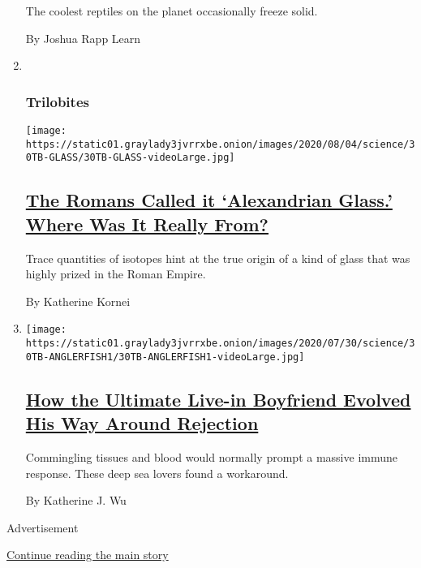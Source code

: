 \begin{enumerate}
  The coolest reptiles on the planet occasionally freeze solid.

  By Joshua Rapp Learn
\item ~
  \hypertarget{trilobites-2}{%
  \subsubsection{Trilobites}\label{trilobites-2}}

  \texttt{[image: https://static01.graylady3jvrrxbe.onion/images/2020/08/04/science/30TB-GLASS/30TB-GLASS-videoLarge.jpg]}

  \hypertarget{the-romans-called-it-alexandrian-glass-where-was-it-really-from}{%
  \subsection{\texorpdfstring{\href{/2020/07/31/science/alexandrian-glass-rome.html}{The
  Romans Called it `Alexandrian Glass.' Where Was It Really
  From?}}{The Romans Called it `Alexandrian Glass.' Where Was It Really From?}}\label{the-romans-called-it-alexandrian-glass-where-was-it-really-from}}

  Trace quantities of isotopes hint at the true origin of a kind of
  glass that was highly prized in the Roman Empire.

  By Katherine Kornei
\item
  \texttt{[image: https://static01.graylady3jvrrxbe.onion/images/2020/07/30/science/30TB-ANGLERFISH1/30TB-ANGLERFISH1-videoLarge.jpg]}

  \hypertarget{how-the-ultimate-live-in-boyfriend-evolved-his-way-around-rejection}{%
  \subsection{\texorpdfstring{\href{/2020/07/30/science/anglerfish-immune-rejection.html}{How
  the Ultimate Live-in Boyfriend Evolved His Way Around
  Rejection}}{How the Ultimate Live-in Boyfriend Evolved His Way Around Rejection}}\label{how-the-ultimate-live-in-boyfriend-evolved-his-way-around-rejection}}

  Commingling tissues and blood would normally prompt a massive immune
  response. These deep sea lovers found a workaround.

  By Katherine J. Wu
\end{enumerate}

Advertisement

\protect\hyperlink{after-mid1}{Continue reading the main story}

